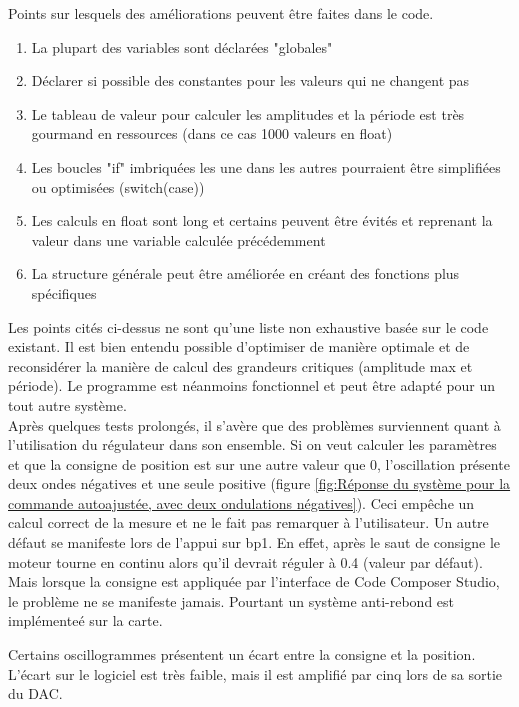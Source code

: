 Points sur lesquels des améliorations peuvent être faites dans le code.
\begin{enumerate}
	\item La plupart des variables sont déclarées "globales"
	\item Déclarer si possible des constantes pour les valeurs qui ne changent pas
	\item Le tableau de valeur pour calculer les amplitudes et la période est très gourmand en ressources (dans ce cas 1000 valeurs en float)
	\item Les boucles "if" imbriquées les une dans les autres pourraient être simplifiées ou optimisées (switch(case))
	\item Les calculs en float sont long et certains peuvent être évités et reprenant la valeur dans une variable calculée précédemment
	\item La structure générale peut être améliorée en créant des fonctions plus spécifiques
\end{enumerate} 

Les points cités ci-dessus ne sont qu'une liste non exhaustive basée sur le code existant. Il est bien entendu possible d'optimiser de manière optimale et de reconsidérer la manière de calcul des grandeurs critiques (amplitude max et période). Le programme est néanmoins fonctionnel et peut être adapté pour un tout autre système.\\
Après quelques tests prolongés, il s'avère que des problèmes surviennent quant à l'utilisation du régulateur dans son ensemble. Si on veut calculer les paramètres et que la consigne de position est sur une autre valeur que 0, l'oscillation présente deux ondes négatives et une seule positive (figure \ref{fig:Réponse du système pour la commande autoajustée, avec deux ondulations négatives}). Ceci empêche un calcul correct de la mesure et ne le fait pas remarquer à l'utilisateur. Un autre défaut se manifeste lors de l'appui sur bp1. En effet, après le saut de consigne le moteur tourne en continu alors qu'il devrait réguler à 0.4 (valeur par défaut). Mais lorsque la consigne est appliquée par l'interface de Code Composer Studio, le problème ne se manifeste jamais. Pourtant un système anti-rebond est implémenteé sur la carte.

 Certains oscillogrammes présentent un écart entre la consigne et la position. L'écart sur le logiciel est très faible, mais il est amplifié par cinq lors de sa sortie du DAC.